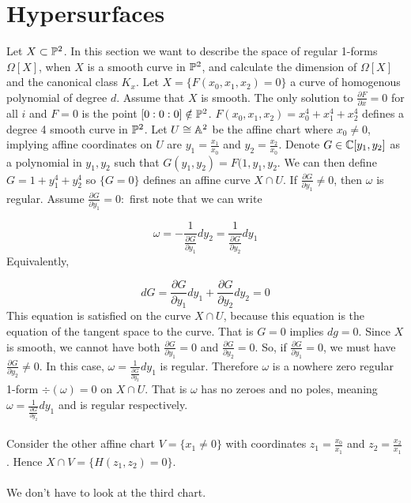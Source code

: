 
\section{Hypersurfaces}
Let $X\subset\pp^2$. In this section we want to describe the space of regular 1-forms $\Omega[X]$, when $X$ is a smooth curve in $\pp^2$, and calculate the dimension of $\Omega[X]$ and the canonical class $K_x$. Let $X = \{F(x_0,x_1,x_2) = 0\}$ a curve of homogenous polynomial of degree $d$. Assume that $X$ is smooth. The only solution to $\frac{\partial F}{\partial x} = 0$ for all $i$ and $F = 0$ is the point $[0:0:0]\notin\pp^2$.
$F(x_0,x_1,x_2) = x_0^4 + x_1^4 + x_2^4$ defines a degree 4 smooth curve in $\pp^2$. Let $U\cong\aa^2$ be the affine chart where $x_0\neq 0$, implying affine coordinates on $U$ are $y_1 = \frac{x_1}{x_0}$ and $y_2 = \frac{x_2}{x_0}$. Denote $G\in\c[y_1, y_2]$ as a polynomial in $y_1,y_2$ such that $G(y_1,y_2) = F(1,y_1,y_2$. We can then define $G = 1 + y_1^4 + y_2^4$ so $\{G = 0\}$ defines an affine curve $X\cap U$.
If $\frac{\partial G}{\partial y_1}\neq 0$, then $\omega$ is regular.
Assume $\frac{\partial G}{\partial y_1} = 0:$ first note that we can write

\[
\omega = -\frac{1}{\frac{\partial G}{\partial y_1}}dy_2 = \frac{1}{\frac{\partial G}{\partial y_2}} dy_1
\]
Equivalently,

\[
dG = \frac{\partial G}{\partial y_1}dy_1 + \frac{\partial G}{\partial y_2}dy_2 = 0
\]
This equation is satisfied on the curve $X\cap U$, because this equation is the equation of the tangent space to the curve. That is $G = 0$ implies $dg = 0$. Since $X$ is smooth, we cannot have both $\frac{\partial G}{\partial y_1} = 0$ and $\frac{\partial G}{\partial y_2} = 0$. So, if $\frac{\partial G}{\partial y_1} = 0$, we must have $\frac{\partial G}{\partial y_2}\neq 0$. In this case, $\omega = \frac{1}{\frac{\partial G}{\partial y_2}} dy_1$ is regular.
Therefore $\omega$ is a nowhere zero regular 1-form $\div(\omega) = 0$ on $X\cap U$. That is $\omega$ has no zeroes and no poles, meaning $\omega = \frac{1}{\frac{\partial G}{\partial y_2}}dy_1$ and is regular respectively.\\ \\
Consider the other affine chart $V = \{x_1\neq 0\}$ with coordinates $z_1 = \frac{x_0}{x_1}$ and $z_2 = \frac{x_2}{x_1}$. Hence $X\cap V = \{H(z_1,z_2) = 0\}$.\\ \\
We don't have to look at the third chart.

